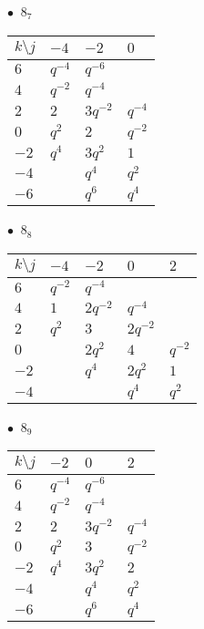 %
\begin{minipage}{\linewidth}
$\bullet\ $ $8_{7}$ \vspace{0.5em} \\
\begin{tabular}{l|lll}
$k \setminus j$ & $-4$ & $-2$ & $0$ \\
\hline
$6$ & $q^{-4}$ & $q^{-6}$ &  \\
$4$ & $q^{-2}$ & $q^{-4}$ &  \\
$2$ & $2$ & $3q^{-2}$ & $q^{-4}$ \\
$0$ & $q^{2}$ & $2$ & $q^{-2}$ \\
$-2$ & $q^{4}$ & $3q^{2}$ & $1$ \\
$-4$ &  & $q^{4}$ & $q^{2}$ \\
$-6$ &  & $q^{6}$ & $q^{4}$ \\
\end{tabular}
\vspace{2em}
\end{minipage}
%
\begin{minipage}{\linewidth}
$\bullet\ $ $8_{8}$ \vspace{0.5em} \\
\begin{tabular}{l|llll}
$k \setminus j$ & $-4$ & $-2$ & $0$ & $2$ \\
\hline
$6$ & $q^{-2}$ & $q^{-4}$ &  &  \\
$4$ & $1$ & $2q^{-2}$ & $q^{-4}$ &  \\
$2$ & $q^{2}$ & $3$ & $2q^{-2}$ &  \\
$0$ &  & $2q^{2}$ & $4$ & $q^{-2}$ \\
$-2$ &  & $q^{4}$ & $2q^{2}$ & $1$ \\
$-4$ &  &  & $q^{4}$ & $q^{2}$ \\
\end{tabular}
\vspace{2em}
\end{minipage}
%
\begin{minipage}{\linewidth}
$\bullet\ $ $8_{9}$ \vspace{0.5em} \\
\begin{tabular}{l|lll}
$k \setminus j$ & $-2$ & $0$ & $2$ \\
\hline
$6$ & $q^{-4}$ & $q^{-6}$ &  \\
$4$ & $q^{-2}$ & $q^{-4}$ &  \\
$2$ & $2$ & $3q^{-2}$ & $q^{-4}$ \\
$0$ & $q^{2}$ & $3$ & $q^{-2}$ \\
$-2$ & $q^{4}$ & $3q^{2}$ & $2$ \\
$-4$ &  & $q^{4}$ & $q^{2}$ \\
$-6$ &  & $q^{6}$ & $q^{4}$ \\
\end{tabular}
\vspace{2em}
\end{minipage}
